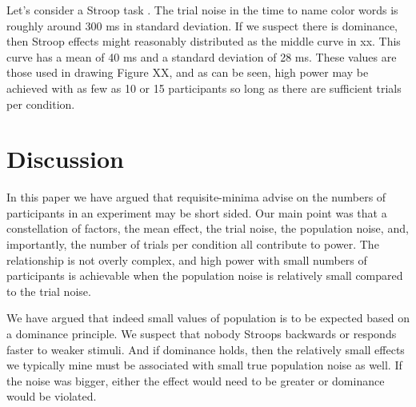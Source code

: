 \documentclass[fignum,nobf,man]{apa}
\begin{document}
Let's consider a Stroop task .  The trial noise in the time to name color words is roughly around 300 ms in standard deviation.  If we suspect there is dominance, then Stroop effects might reasonably distributed as the middle curve in xx.  This curve has a mean of 40 ms and a standard deviation of 28 ms.    These values are those used in drawing Figure XX, and as can be seen, high power may be achieved with as few as 10 or 15 participants so long as there are sufficient trials per condition.  

\section{Discussion}

In this paper we have argued that requisite-minima advise on the numbers of participants in an experiment may be short sided.  Our main point was that a constellation of factors, the mean effect, the trial noise, the population noise, and, importantly, the number of trials per condition all contribute to power.  The relationship is not overly complex, and high power with small numbers of participants is achievable when the population noise is relatively small compared to the trial noise.

We have argued that indeed small values of population is to be expected based on a dominance principle.  We suspect that nobody Stroops backwards or responds faster to weaker stimuli.  And if dominance holds, then the relatively small effects we typically mine must be associated with small true population noise as well.  If the noise was bigger, either the effect would need to be greater or dominance would be violated.  
\end{document}
